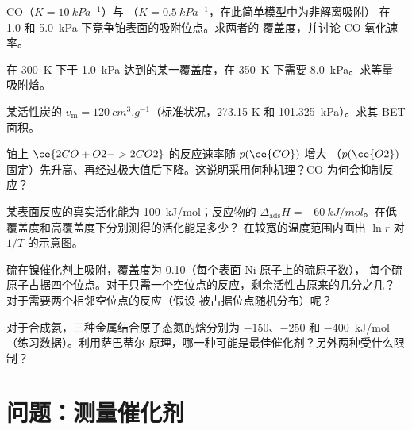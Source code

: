 \begin{exercise}[$\star\star$]\label{exo:b3:surfaces-catalysis:6}
CO（$K = \qty{10}{kPa^{-1}}$）与 （$K = \qty{0.5}{kPa^{-1}}$，在此简单模型中为非解离吸附）
在 1.0 和 \qty{5.0}{kPa} 下竞争铂表面的吸附位点。求两者的
覆盖度，并讨论 CO 氧化速率。
\end{exercise}

\begin{exercise}[$\star\star$]\label{exo:b3:surfaces-catalysis:7}
在 \qty{300}{K} 下于 \qty{1.0}{kPa} 达到的某一覆盖度，在 \qty{350}{K} 下需要 \qty{8.0}{kPa}。求等量
吸附焓。
\end{exercise}

\begin{exercise}[$\star\star$]\label{exo:b3:surfaces-catalysis:8}
某活性炭的 $v_{\mathrm m} = \qty{120}{cm^3.g^{-1}}$（标准状况，273.15 K 和
\qty{101.325}{kPa}）。求其 BET 面积。
\end{exercise}

\begin{exercise}[$\star\star$]\label{exo:b3:surfaces-catalysis:9}
铂上 $\ce{2 CO + O2 -> 2 CO2}$ 的反应速率随 $p(\ce{CO})$ 增大
（$p(\ce{O2})$ 固定）先升高、再经过极大值后下降。这说明采用何种机理？CO
为何会抑制反应？
\end{exercise}

\begin{exercise}[$\star\star\star$]\label{exo:b3:surfaces-catalysis:10}
某表面反应的真实活化能为 \qty{100}{kJ/mol}；反应物的
$\Delta_{\mathrm{ads}}H = \qty{-60}{kJ/mol}$。在低覆盖度和高覆盖度下分别测得的活化能是多少？
在较宽的温度范围内画出 $\ln r$ 对 $1/T$ 的示意图。
\end{exercise}

\begin{exercise}[$\star\star\star$]\label{exo:b3:surfaces-catalysis:11}
硫在镍催化剂上吸附，覆盖度为 0.10（每个表面 Ni 原子上的硫原子数），
每个硫原子占据四个位点。对于只需一个空位点的反应，剩余活性占原来的几分之几？
对于需要两个相邻空位点的反应（假设
被占据位点随机分布）呢？
\end{exercise}

\begin{exercise}[$\star\star\star$]\label{exo:b3:surfaces-catalysis:12}
对于合成氨，三种金属结合原子态氮的焓分别为
$-150$、$-250$ 和 \qty{-400}{kJ/mol}（练习数据）。利用萨巴蒂尔
原理，哪一种可能是最佳催化剂？另外两种受什么限制？
\end{exercise}

\section{问题：测量催化剂}

